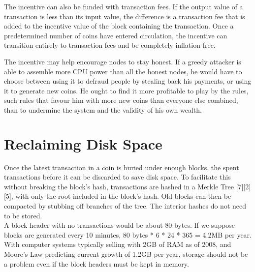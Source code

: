 \documentclass{article}
\begin{document}
The incentive can also be funded with transaction fees.
If the output value of a transaction is
less than its input value, the difference is a transaction fee that is added to the incentive value of
the block containing the transaction.
Once a predetermined number of coins have entered
circulation, the incentive can transition entirely to transaction fees and be completely inflation
free.

The incentive may help encourage nodes to stay honest.
If a greedy attacker is able to
assemble more CPU power than all the honest nodes, he would have to choose between using it
to defraud people by stealing back his payments, or using it to generate new coins.
He ought to find it more profitable to play by the rules, such rules that favour him with more new coins than
everyone else combined, than to undermine the system and the validity of his own wealth.

\section{Reclaiming Disk Space}\label{sec:reclaiming-disk-space}
Once the latest transaction in a coin is buried under enough blocks, the spent transactions before
it can be discarded to save disk space.
To facilitate this without breaking the block's hash,
transactions are hashed in a Merkle Tree [7][2][5], with only the root included in the block's hash.
Old blocks can then be compacted by stubbing off branches of the tree.
The interior hashes do not need to be stored.\\



A block header with no transactions would be about 80 bytes.
If we suppose blocks are generated every 10 minutes, 80 bytes * 6 * 24 * 365 = 4.2MB per year.
With computer systems typically selling with 2GB of RAM as of 2008, and Moore's Law predicting current growth of
1.2GB per year, storage should not be a problem even if the block headers must be kept in memory.
\end{document}
